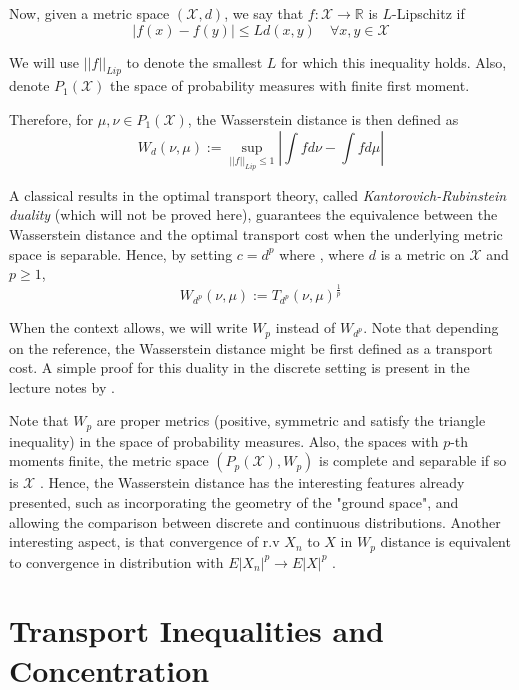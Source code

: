 \documentclass[10pt]{article}
\theoremstyle{definition}
\begin{document}
Now, given a metric space $(\mathcal X, d)$, we say that $f: \mathcal X \rightarrow \mathbb R$
is $L$-Lipschitz if
\begin{equation}
	\mid f(x) - f(y) \mid \leq L d(x,y) \quad \forall x,y \in \mathcal X
\end{equation}

We will use $||f||_{Lip}$ to denote the smallest $L$ for which this inequality holds.
Also, denote $P_1(\mathcal X)$ the space of probability measures with finite first moment.

Therefore, for $\mu,\nu \in P_1(\mathcal X)$, the Wasserstein distance is then defined as 
$$
W_d(\nu, \mu) := \sup_{||f||_{Lip}\leq 1} \left |
\int f d\nu - \int f d\mu	
\right |
$$

A classical results in the optimal transport theory, called
\textit{Kantorovich-Rubinstein duality} (which will not be proved here),
guarantees the equivalence between the Wasserstein distance and the optimal transport cost
when the underlying metric space is separable.
Hence, by setting $c = d^p$ where , where $d$ is a metric
on $\mathcal X$ and $p \geq 1$,
\begin{equation}
W_{d^p}(\nu,\mu):= T_{d^p}(\nu,\mu)^{\frac{1}{p}}
\end{equation}

When the context allows, we will write $W_p$ instead of $W_{d^p}$. Note that depending on
the reference, the Wasserstein distance might be first defined as a transport cost. A
simple proof for this duality in the discrete setting 
is present in the lecture notes by \citet{van2014probability}.

Note that $W_p$ are proper metrics (positive, symmetric and satisfy the triangle inequality)
in the space of probability measures. Also, the spaces with $p$-th moments finite, the
metric space $(P_p(\mathcal X), W_p)$ is complete and separable if so is $\mathcal X$ \citep{panaretos2019statistical}. Hence, the Wasserstein distance has the interesting features
already presented, such as incorporating the geometry of the "ground space", and allowing
the comparison between discrete and continuous distributions. Another interesting aspect,
is that convergence of r.v $X_n$ to $X$ in $W_p$ distance is equivalent to convergence in
distribution with $E|X_n|^p \rightarrow E |X|^p$ \citep{panaretos2019statistical}.

\section{Transport Inequalities and Concentration}
\end{document}
